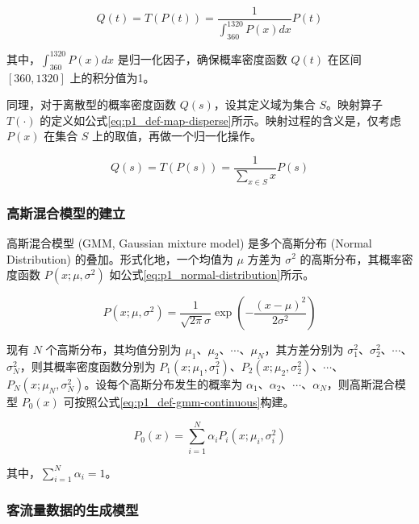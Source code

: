 \documentclass[12pt,a4paper]{mcmthesis}
\begin{document}
\begin{equation}
	Q(t) = T(P(t)) = \frac{1}{\int_{360}^{1320}P(x)dx} P(t)
	\label{eq:p1_def-map-continuous}
\end{equation}

其中，$\int_{360}^{1320}P(x)dx$ 是归一化因子，确保概率密度函数 $Q(t)$ 在区间 $[360,1320]$ 上的积分值为1。

同理，对于离散型的概率密度函数 $Q(s)$，设其定义域为集合 $S$。映射算子 $T(\cdot)$ 的定义如公式\ref{eq:p1_def-map-disperse}所示。映射过程的含义是，仅考虑$P(x)$ 在集合 $S$ 上的取值，再做一个归一化操作。

\begin{equation}
	Q(s) = T(P(s)) = \frac{1}{\sum_{x \in S} x} P(s)
	\label{eq:p1_def-map-disperse}
\end{equation}

\subsubsection{高斯混合模型的建立}

高斯混合模型 (GMM, Gaussian mixture model) 是多个高斯分布 (Normal Distribution) 的叠加。形式化地，一个均值为 $\mu$ 方差为 $\sigma^2$ 的高斯分布，其概率密度函数 $P(x;\mu,\sigma^2)$ 如公式\ref{eq:p1_normal-distribution}所示。

\begin{equation}
	P(x;\mu,\sigma^2) = \frac{1}{\sqrt{2\pi}\sigma} \exp \left( - \frac{(x-\mu)^2}{2\sigma^2} \right)
	\label{eq:p1_normal-distribution}
\end{equation}

现有 $N$ 个高斯分布，其均值分别为 $\mu_1$、$\mu_2$、$\cdots$、$\mu_N$，其方差分别为 $\sigma^2_1$、$\sigma^2_2$、$\cdots$、$\sigma^2_N$，则其概率密度函数分别为 $P_1(x;\mu_1,\sigma^2_1)$、$P_2(x;\mu_2,\sigma^2_2)$、$\cdots$、$P_N(x;\mu_N,\sigma^2_N)$。设每个高斯分布发生的概率为 $\alpha_1$、$\alpha_2$、$\cdots$、$\alpha_N$，则高斯混合模型 $P_0(x)$ 可按照公式\ref{eq:p1_def-gmm-continuous}构建。

\begin{equation}
	P_0(x) = \sum_{i=1}^{N} \alpha_i P_i(x;\mu_i,\sigma^2_i)
	\label{eq:p1_def-gmm-continuous}
\end{equation}

其中，$\sum_{i=1}^{N} \alpha_i=1$。



\subsubsection{客流量数据的生成模型}
\end{document}
